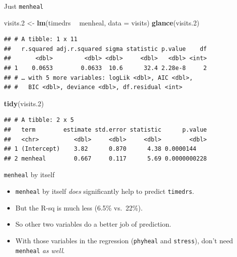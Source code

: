 \documentclass[ignorenonframetext,]{beamer}
\newenvironment{Shaded}{\begin{snugshade}}{\end{snugshade}}
\newcommand{\DataTypeTok}[1]{\textcolor[rgb]{0.13,0.29,0.53}{#1}}
\newcommand{\FloatTok}[1]{\textcolor[rgb]{0.00,0.00,0.81}{#1}}
\newcommand{\KeywordTok}[1]{\textcolor[rgb]{0.13,0.29,0.53}{\textbf{#1}}}
\newcommand{\NormalTok}[1]{#1}
\newcommand{\OperatorTok}[1]{\textcolor[rgb]{0.81,0.36,0.00}{\textbf{#1}}}
\newcommand{\StringTok}[1]{\textcolor[rgb]{0.31,0.60,0.02}{#1}}
\begin{document}
\begin{frame}[fragile]{Just \texttt{menheal}}
\protect\hypertarget{just-menheal}{}

\footnotesize

\begin{Shaded}
\begin{Highlighting}[]
\NormalTok{visits}\FloatTok{.2}\NormalTok{ <-}\StringTok{ }\KeywordTok{lm}\NormalTok{(timedrs }\OperatorTok{~}\StringTok{ }\NormalTok{menheal, }\DataTypeTok{data =}\NormalTok{ visits)}
\KeywordTok{glance}\NormalTok{(visits}\FloatTok{.2}\NormalTok{)}
\end{Highlighting}
\end{Shaded}

\begin{verbatim}
## # A tibble: 1 x 11
##   r.squared adj.r.squared sigma statistic p.value    df
##       <dbl>         <dbl> <dbl>     <dbl>   <dbl> <int>
## 1    0.0653        0.0633  10.6      32.4 2.28e-8     2
## # … with 5 more variables: logLik <dbl>, AIC <dbl>,
## #   BIC <dbl>, deviance <dbl>, df.residual <int>
\end{verbatim}

\begin{Shaded}
\begin{Highlighting}[]
\KeywordTok{tidy}\NormalTok{(visits}\FloatTok{.2}\NormalTok{)}
\end{Highlighting}
\end{Shaded}

\begin{verbatim}
## # A tibble: 2 x 5
##   term        estimate std.error statistic      p.value
##   <chr>          <dbl>     <dbl>     <dbl>        <dbl>
## 1 (Intercept)    3.82      0.870      4.38 0.0000144   
## 2 menheal        0.667     0.117      5.69 0.0000000228
\end{verbatim}

\normalsize

\end{frame}

\begin{frame}[fragile]{\texttt{menheal} by itself}
\protect\hypertarget{menheal-by-itself}{}

\begin{itemize}
\item
  \texttt{menheal} by itself \emph{does} significantly help to predict
  \texttt{timedrs}.
\item
  But the R-sq is much less (6.5\% vs.~22\%).
\item
  So other two variables do a better job of prediction.
\item
  With those variables in the regression (\texttt{phyheal} and
  \texttt{stress}), don't need \texttt{menheal} \emph{as well}.
\end{itemize}

\end{frame}
\end{document}
